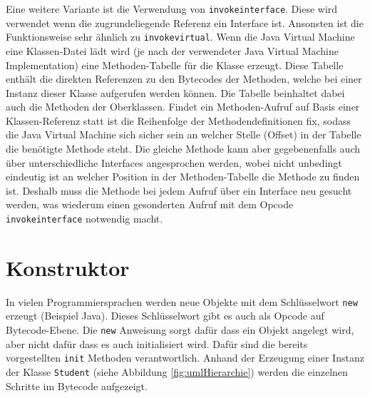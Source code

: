 \documentclass[conference]{IEEEtran}
\begin{document}
Eine weitere Variante ist die Verwendung von \verb|invokeinterface|. Diese wird verwendet wenn die zugrundeliegende Referenz ein Interface ist. Ansonsten ist die Funktionsweise sehr ähnlich zu \verb|invokevirtual|. Wenn die Java Virtual Machine eine Klassen-Datei lädt wird (je nach der verwendeter Java Virtual Machine Implementation) eine Methoden-Tabelle für die Klasse erzeugt. Diese Tabelle enthält die direkten Referenzen zu den Bytecodes der Methoden, welche bei einer Instanz dieser Klasse aufgerufen werden können. Die Tabelle beinhaltet dabei auch die Methoden der Oberklassen. Findet ein Methoden-Aufruf auf Basis einer Klassen-Referenz statt ist die Reihenfolge der Methodendefinitionen fix, sodass die Java Virtual Machine sich sicher sein an welcher Stelle (Offset) in der Tabelle die benötigte Methode steht. Die gleiche Methode kann aber gegebenenfalls auch über unterschiedliche Interfaces angesprochen werden, wobei nicht unbedingt eindeutig ist an welcher Position in der Methoden-Tabelle die Methode zu finden ist. Deshalb muss die Methode bei jedem Aufruf über ein Interface neu gesucht werden, was wiederum einen gesonderten Aufruf mit dem Opcode \verb|invokeinterface| notwendig macht.\cite{Venners.1997}

\section{Konstruktor}
In vielen Programmiersprachen werden neue Objekte mit dem Schlüsselwort \verb|new| erzeugt (Beispiel Java). Dieses Schlüsselwort gibt es auch als Opcode auf Bytecode-Ebene. Die \verb|new| Anweisung sorgt dafür dass ein Objekt angelegt wird, aber nicht dafür dass es auch initialisiert wird. Dafür sind die bereits vorgestellten \verb|init| Methoden verantwortlich. Anhand der Erzeugung einer Instanz der Klasse \verb|Student| (siehe Abbildung \ref{fig:umlHierarchie}) werden die einzelnen Schritte im Bytecode aufgezeigt.
\end{document}
